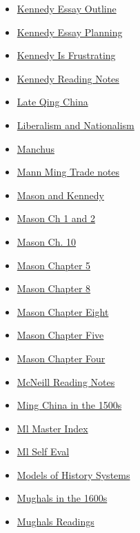 \documentclass[11pt]{article}
\begin{document}
\begin{itemize}
\begin{itemize}
\begin{itemize}
\item \href{history/history10/KBdHistMAKennedyOutline.org}{Kennedy Essay Outline}
\item \href{history/history10/KBe20hist201retKennedyEssay.org}{Kennedy Essay Planning}
\item \href{history/history10/KBhHIST201KennedyIsFrustrating.org}{Kennedy Is Frustrating}
\item \href{history/history10/KBKennedyNotes.org}{Kennedy Reading Notes}
\item \href{history/history10/KBhHIST101LateQingChina.org}{Late Qing China}
\item \href{history/history10/KBhHIST201LiberalismAndNationalism.org}{Liberalism and Nationalism}
\item \href{history/history10/KBhHIST201Qing1500s.org}{Manchus}
\item \href{history/history10/retExr0nMannMingTrade.org}{Mann Ming Trade notes}
\item \href{history/history10/KBhHIST201MasonAndKennedy.org}{Mason and Kennedy}
\item \href{history/history10/KBhHIST201MasonCh1n2.org}{Mason Ch 1 and 2}
\item \href{history/history10/KBxMason10.org}{Mason Ch. 10}
\item \href{history/history10/KBhHIST201MasonCh5.org}{Mason Chapter 5}
\item \href{history/history10/KBhHIST201MasonCh8.org}{Mason Chapter 8}
\item \href{history/history10/KBxMasonCh8.org}{Mason Chapter Eight}
\item \href{history/history10/KBxHIST201MasonCh5n7.org}{Mason Chapter Five}
\item \href{history/history10/KBxMasonCh4.org}{Mason Chapter Four}
\item \href{history/history10/KBMcNeill.org}{McNeill Reading Notes}
\item \href{history/history10/KBhHIST201MingChina1500.org}{Ming China in the 1500s}
\item \href{history/history10/KBMlMasterIndex.org}{Ml Master Index}
\item \href{history/history10/KBMlSelfEval.org}{Ml Self Eval}
\item \href{history/history10/KBhHIST201HistModHist.org}{Models of History Systems}
\item \href{history/history10/KBhHIST201Mughals1600s.org}{Mughals in the 1600s}
\item \href{history/history10/KBe20hist201MughalsReadings.org}{Mughals Readings}

\end{itemize}
\end{itemize}
\end{itemize}
\end{document}
